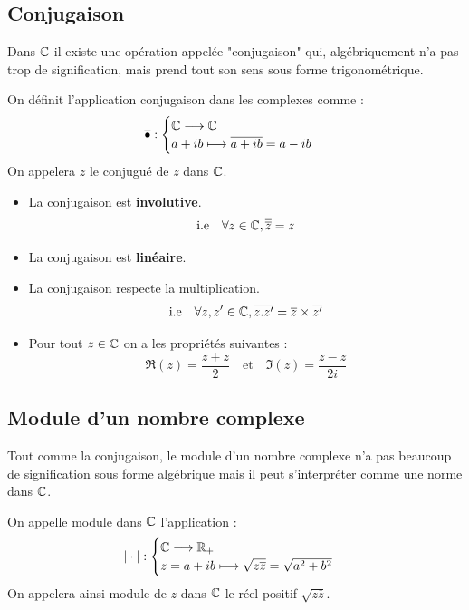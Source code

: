 \subsection{Conjugaison}

Dans $\mathbb{C}$ il existe une opération appelée "conjugaison" qui, algébriquement n'a pas trop de signification, mais 
prend tout son sens sous forme trigonométrique. 

\begin{definition}[Conjugaison]
    On définit l'application conjugaison dans les complexes comme : 
    \[ \overline{\bullet} : 
        \begin{cases}
            \mathbb{C} \longrightarrow \mathbb{C} \\ 
            a + i b \longmapsto \overline{a+ib} = a- i b
        \end{cases} \] 
    On appelera $\overline{z}$ le conjugué de $z$ dans $\mathbb{C}$. 
\end{definition}

\begin{prop}[Conjugaison]
    \begin{itemize}
        \item La conjugaison est \textbf{involutive}. 
            \[ \text{i.e} \quad \forall z \in \mathbb{C}, \overline{\overline{z}} = z \] 
        \item La conjugaison est \textbf{linéaire}. 
        \item La conjugaison respecte la multiplication. 
            \[ \text{i.e} \quad \forall z,z' \in \mathbb{C}, \overline{z . z'} = \overline{z} \times \overline{z'} \]
        \item Pour tout $z \in \mathbb{C}$ on a les propriétés suivantes : 
            \[ \Re(z) = \frac{z + \overline{z}}{2} \quad \text{et} \quad \Im(z) = \frac{z - \overline{z}}{2i} \] 
    \end{itemize}
\end{prop}

\subsection{Module d'un nombre complexe}

Tout comme la conjugaison, le module d'un nombre complexe n'a pas beaucoup de signification sous forme algébrique 
mais il peut s'interpréter comme une norme dans $\mathbb{C}$. 

\begin{definition}
    On appelle module dans $\mathbb{C}$ l'application : 
        \[ | \cdot | : 
            \begin{cases}
                \mathbb{C} \longrightarrow \mathbb{R}_+ \\ 
                z = a + ib \longmapsto \sqrt{z \overline{z}} = \sqrt{a^2 + b^2}
            \end{cases} \] 
    On appelera ainsi module de $z$ dans $\mathbb{C}$ le réel positif $\sqrt{z \overline{z}}$. 
\end{definition}

